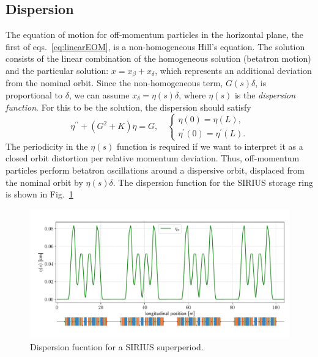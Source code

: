 \subsection{Dispersion}
The equation of motion for off-momentum particles in the horizontal plane, the first of eqs.~\eqref{eq:linearEOM}, is a non-homogeneous Hill's equation. The solution consists of the linear combination of the homogeneous solution (betatron motion) and the particular solution: $x=x_\beta+ x_\delta$, which represents an additional deviation from the nominal orbit. Since the non-homogeneous term, $G(s)\delta$, is proportional to $\delta$, we can assume  $x_{\delta} = \eta(s)\delta$, where $\eta(s)$ is the \textit{dispersion function}. For this to be the solution, the dispersion should satisfy
    \begin{equation*}
        \eta^{\prime\prime}+(G^2+K)\eta=G,\quad
        \begin{cases}
            \eta(0) = \eta(L),\\
            \eta^\prime(0) = \eta^\prime(L).
        \end{cases}
    \end{equation*}
    The periodicity in the $\eta(s)$ function is required if we want to interpret it as a closed orbit distortion per relative momentum deviation. Thus, off-momentum particles perform betatron oscillations around a dispersive orbit, displaced from the nominal orbit by $\eta(s)\delta$. The dispersion function for the SIRIUS storage ring is shown in Fig.~\ref{dispersion_func}
    \begin{figure}[htb]
        \centering
        \includegraphics[width=\textwidth]{Images/dispersion.pdf}
        \caption[Dispersion function for a SIRIUS superperiod.]{Dispersion fucntion for a SIRIUS superperiod.}
        \label{dispersion_func}
    \end{figure}
